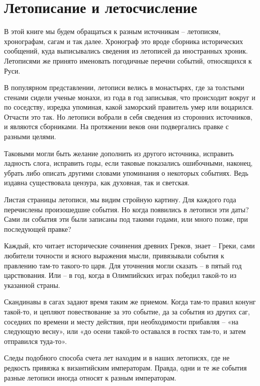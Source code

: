 \chapter{Летописание и летосчисление}


В этой книге мы будем обращаться к разным источникам – летописям, хронографам, сагам и так далее. Хронограф это вроде сборника исторических сообщений, куда выписывались сведения из летописей да иностранных хроник. Летописями же принято именовать погодичные перечни событий, относящихся к Руси.

В популярном представлении, летописи велись в монастырях, где за толстыми стенами сидели ученые монахи, из года в год записывая, что происходит вокруг и по соседству, изредка упоминая, какой заморский правитель умер или воцарился. Отчасти это так. Но летописи вобрали в себя сведения из сторонних источников, и являются сборниками. На протяжении веков они подвергались правке с разными целями.

Таковыми могли быть желание дополнить из другого источника, исправить ладность слога, исправить годы, если таковые показались ошибочными, наконец, убрать либо описать другими словами упоминания о некоторых событиях. Ведь издавна существовала цензура, как духовная, так и светская.
 
Листая страницы летописи, мы видим стройную картину. Для каждого года перечислены произошедшие события. Но когда появились в летописи эти даты? Сами ли события эти были записаны под такими годами, или много позже, при последующей правке?

Каждый, кто читает исторические сочинения древних Греков, знает – Греки, сами любители точности и ясного выражения мысли, привязывали события к правлению там-то такого-то царя. Для уточнения могли сказать – в пятый год царствования. Или – в год, когда в Олимпийских играх победил такой-то из указанной страны.

Скандинавы в сагах задают время таким же приемом. Когда там-то правил конунг такой-то, и цепляют повествование за это событие, да за события из других саг, соседних по времени и месту действия, при необходимости прибавляя – «на следующую весну», или «до осени такой-то оставался в гостях там-то, и затем отправился туда-то».

Следы подобного способа счета лет находим и в наших летописях, где не редкость привязка к византийским императорам. Правда, одни и те же события разные летописи иногда относят к разным императорам.

